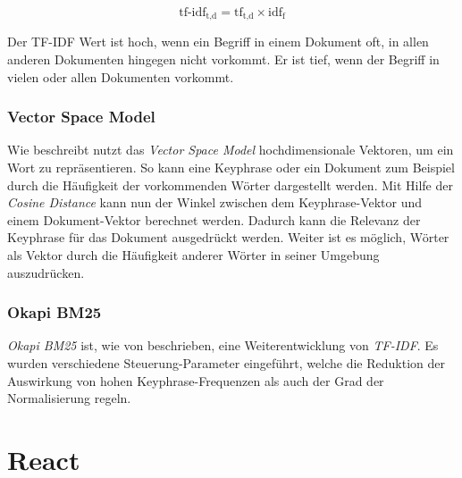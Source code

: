 \[
    \text{tf-idf}_{\text{t,d}} = \text{tf}_{\text{t,d}}\times\text{idf}_\text{f}
\]

Der TF-IDF Wert ist hoch, wenn ein Begriff in einem Dokument oft, in allen anderen Dokumenten hingegen nicht vorkommt. Er ist tief, wenn der Begriff in vielen oder allen Dokumenten vorkommt.


\subsubsection{Vector Space Model}


Wie \cite{manning2008introduction} beschreibt nutzt das \textit{Vector Space Model} hochdimensionale Vektoren, um ein Wort zu repräsentieren. So kann eine \gls{Keyphrase} oder ein Dokument zum Beispiel durch die Häufigkeit der vorkommenden Wörter dargestellt werden. Mit Hilfe der \textit{Cosine Distance} kann nun der Winkel zwischen dem \gls{Keyphrase}-Vektor und einem Dokument-Vektor berechnet werden. Dadurch kann die Relevanz der \gls{Keyphrase} für das Dokument ausgedrückt werden. Weiter ist es möglich, Wörter als Vektor durch die Häufigkeit anderer Wörter in seiner Umgebung auszudrücken. 


\subsubsection{Okapi BM25}


\textit{Okapi BM25} ist, wie von \cite{robertson2009probabilistic} beschrieben, eine Weiterentwicklung von \textit{TF-IDF}. Es wurden verschiedene Steuerung-Parameter eingeführt, welche die Reduktion der Auswirkung von hohen \gls{Keyphrase}-Frequenzen als auch der Grad der Normalisierung regeln.



\section{React}\label{react}



